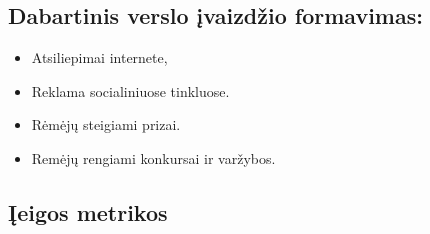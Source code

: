 \documentclass{VUMIFPSkursinis}
\begin{document}
	\subsection{Dabartinis verslo įvaizdžio formavimas:}
		\renewcommand{\labelitemi}{$\bullet$}
			\begin{itemize}
				\item Atsiliepimai internete,
				\item Reklama socialiniuose tinkluose.
				\item Rėmėjų steigiami prizai.
				\item Remėjų rengiami konkursai ir varžybos.
			\end{itemize}
			
	\subsection{Įeigos metrikos}			
\end{document}
